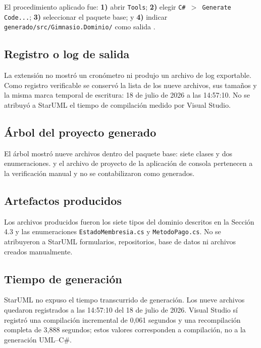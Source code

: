 \documentclass[12pt,a4paper]{article}
\begin{document}
El procedimiento aplicado fue: \textbf{1)} abrir \texttt{Tools}; \textbf{2)}
elegir \texttt{C\# $>$ Generate Code...}; \textbf{3)} seleccionar el paquete
base; y \textbf{4)} indicar
\texttt{generado/src/Gimnasio.Dominio/} como salida
\cite{starumlCSharp2025}.

\subsection{Registro o log de salida}

La extensión no mostró un cronómetro ni produjo un archivo de log exportable.
Como registro verificable se conservó la lista de los nueve archivos, sus
tamaños y la misma marca temporal de escritura: 18 de julio de 2026 a las
14:57:10. No se atribuyó a StarUML el tiempo de compilación medido por Visual
Studio.

\subsection{Árbol del proyecto generado}

El árbol mostró nueve archivos dentro del paquete base: siete clases y dos
enumeraciones.  y el archivo de proyecto de la aplicación de
consola pertenecen a la verificación manual y no se contabilizaron como
generados.

\subsection{Artefactos producidos}

Los archivos producidos fueron los siete tipos del dominio descritos en la
Sección 4.3 y las enumeraciones \texttt{EstadoMembresia.cs} y
\texttt{MetodoPago.cs}. No se atribuyeron a StarUML formularios, repositorios,
base de datos ni archivos creados manualmente.

\subsection{Tiempo de generación}

StarUML no expuso el tiempo transcurrido de generación. Los nueve archivos
quedaron registrados a las 14:57:10 del 18 de julio de 2026. Visual Studio sí
registró una compilación incremental de 0,061 segundos y una recompilación
completa de 3,888 segundos; estos valores corresponden a compilación, no a la
generación UML--C\#.
\end{document}
